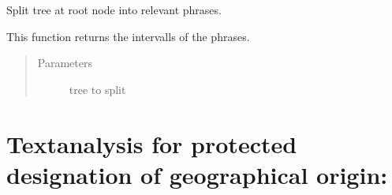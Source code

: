 \documentclass[letterpaper,10pt,english]{sphinxmanual}
\begin{document}

\begin{fulllineitems}
\label{\detokenize{api:conll_parser.split_tree}}
Split tree at root node into relevant phrases.

This function returns the intervalls of the phrases.
\begin{quote}\begin{description}
\item[{Parameters}] \leavevmode
{} \textendash{} tree to split

\end{description}\end{quote}

\end{fulllineitems}



\section{Textanalysis for protected designation of geographical origin:}
\label{\detokenize{api:module-geoschutz_check}}\label{\detokenize{api:textanalysis-for-protected-designation-of-geographical-origin}}
\end{document}
